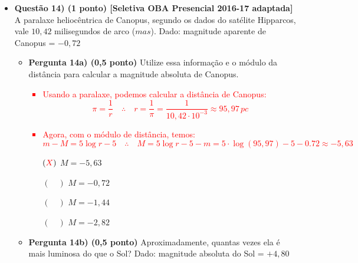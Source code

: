 \documentclass[a4paper, 12pt]{article}
\newcommand{\red}[1]{\textcolor{red}{#1}}
\begin{document}
\begin{flushleft}
\begin{itemize}
            \item \textbf{Questão 14) (1 ponto) [Seletiva OBA Presencial 2016-17 adaptada]} A paralaxe heliocêntrica de Canopus, segundo os dados do satélite Hipparcos, vale $10,42$ milisegundos de arco ($mas$). \linebreak\linebreak Dado: magnitude aparente de Canopus = $-0,72$
                \begin{itemize}
                    \item \textbf{Pergunta 14a) (0,5 ponto)} Utilize essa informação e o módulo da distância para calcular a magnitude absoluta de Canopus.
                        \red{\begin{itemize}
                            \item Usando a paralaxe, podemos calcular a distância de Canopus:
                                \begin{equation*}
                                    \pi = \frac{1}{r} \quad \therefore \quad r = \frac{1}{\pi}=\frac{1}{10,42 \cdot 10^{-3}} \approx 95,97 \, pc
                                \end{equation*}
                            \item Agora, com o módulo de distância, temos:
                                \begin{equation*}
                                    m-M=5 \log r -5 \quad \therefore \quad M = 5 \log r -5-m=5 \cdot \log (95,97)-5-0.72 \approx -5,63
                                \end{equation*}
                        \end{itemize}}
                        \begin{itemize}
                            \item[$(\red{X})$] $M = -5,63$
                            \item[$(\quad)$] $M = -0,72$
                            \item[$(\quad)$] $M = -1,44$
                            \item[$(\quad)$] $M = -2,82$
                        \end{itemize}
                    \item \textbf{Pergunta 14b) (0,5 ponto)} Aproximadamente, quantas vezes ela é mais luminosa do que o Sol? \linebreak Dado: magnitude absoluta do Sol = $+4,80$
                        \red{\begin{itemize}

\end{itemize}}
\end{itemize}
\end{itemize}
\end{flushleft}
\end{document}
